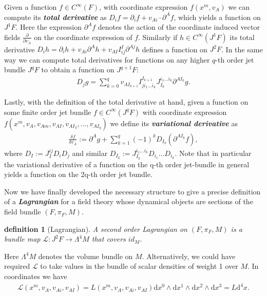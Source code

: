 \documentclass[a4paper,12pt, DIV=14, BCOR=5mm, twoside, headsepline, numbers=noenddot]{scrbook}
\newtheorem{definition}{definition}[section]
\begin{document}
Given a function $f \in C^{\infty}(F)$, with coordinate expression $f(x^m, v_A)$ we can compute its \textit{\textbf{total derivative}} as $D_if = \partial_i f + v_{Ai}\cdot \partial^A f$, which yields a function on $J^1F$. Here the expression $\partial^A f$ denotes the action of the coordinate induced vector fields $\frac{\partial}{\partial v_A}$ on the coordinate expression of $f$. Similarly if $h \in C^{\infty}(J^1F)$ its total derivative $D_i h = \partial_i h + v_{Ai} \partial^A h + v_{AI}I^I_{ij} \partial ^{Aj} h$ defines a function on $J^2F$. In the same way we can compute total derivatives for functions on any higher $q$-th order jet bundle $J^qF$ to obtain a function on $J^{q+1}F$:
\begin{align}\label{totDer}
    D_j g = \sum _{k = 0}^{q}  v_{AI_{k+1}}I^{I_{k+1}}_{ji_1...i_k}J_{I_k}^{i_1...i_k}\partial^{AI_k} g.
\end{align}
 

Lastly, with the definition of the total derivative at hand, given a function on some finite order jet bundle $f \in C^{\infty}(J^qF)$ with coordinate expression $f(x^m,v_A,v_{Am},v_{AI},v_{AI_{3}},...,v_{AI_{q}})$ we define its \textit{\textbf{variational derivative}} as 
\begin{align}\label{varDer}
\frac{\delta f}{\delta v_A} := \partial^{A}g + \sum _{k = 1}^q (-1)^k D_{I_k}(\partial^{AI_k}f),
\end{align}
where $D_I := J_I ^{ij} D_i D_j$ and similar $D_{I_k} := J_{I_k}^{i_1...i_k} D_{i_1} ... D_{i_k}$.
Note that in particular the variational derivative of a function on the q-th order jet-bundle in general yields a function on the 2q-th order jet bundle.

Now we have finally developed the necessary structure to give a precise definition of a \textbf{\textit{Lagrangian}} for a field theory whose dynamical objects are sections of the field bundle $(F, \pi_F,M)$.
\begin{definition}[Lagrangian]
A second order Lagrangian on $(F,\pi_F,M)$ is a bundle map $\mathcal{L} : J^2F \rightarrow \Lambda^4M$ that covers $id_M$.
\end{definition}
Here $\Lambda^4 M$ denotes the volume bundle on $M$. Alternatively, we could have required $\mathcal{L}$ to take values in the bundle of scalar densities of weight 1 over $M$. In coordinates we have 
\begin{align}
    \mathcal{L}(x^m,v_A,v_{Ai},v_{AI}) = L(x^m,v_A,v_{Ai},v_{AI}) \mathrm{d}x^0 \wedge \mathrm{d}x^1 \wedge \mathrm{d}x^2 \wedge \mathrm{d}x^3 = L \mathrm{d}^4x.
\end{align} 
\end{document}
